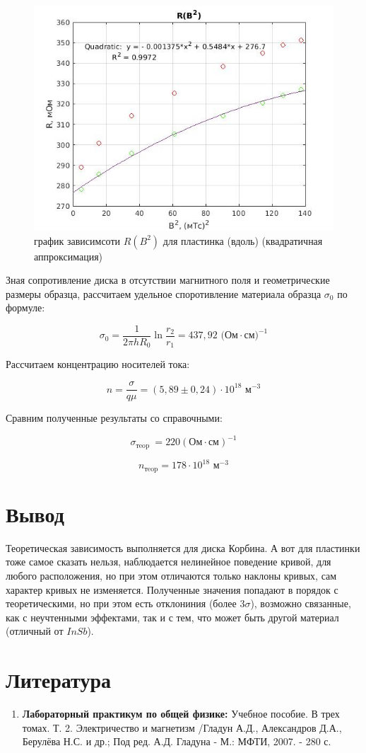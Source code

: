 \documentclass[a4paper, 12pt]{article}%
\begin{document}
\begin{center}
\begin{figure}[!h]
    \centering
    \includegraphics[width = 10 cm]{graph2(no_disk)(quadratic_2).jpg}
    \caption{график зависимсоти $R(B^2)$ для пластинка (вдоль) (квадратичная аппроксимация)}
    \label{ser3_q}
\end{figure}
\end{center}

Зная сопротивление диска в отсутствии магнитного поля и геометрические размеры образца, рассчитаем удельное споротивление материала образца $\sigma_0$ по формуле:

\[ \sigma_{0}=\frac{1}{2 \pi h R_{0}} \ln \frac{r_{2}}{r_{1}}= 437,92 \text{ (Ом} \cdot \text{см)}^{-1}\]

Рассчитаем концентрацию носителей тока:

\[ n=\frac{\sigma}{q \mu} = (5,89 \pm 0,24) \cdot 10^{18} \text{ м}^{-3} \]


Сравним полученные результаты со справочными:

\[ \sigma_{\text {тeop }}= 220 \left(\text{Ом} \cdot \text{см}\right)^{-1}\]

\[ n_{\text{тeop}}= 178 \cdot 10^{18} \text{ м}^{-3} \]

\section{Вывод}

Теоретическая зависимость выполняется для диска Корбина. А вот для пластинки тоже самое сказать нельзя, наблюдается нелинейное поведение кривой, для любого расположения, но при этом отличаются 
только наклоны кривых, сам характер кривых не изменяется. Полученные значения попадают в порядок с теоретическими, но при этом есть отклониния (более $3\sigma$), возможно связанные, как с неучтенными эффектами, так и с тем, что может быть другой материал (отличный от $InSb$).
\section{Литература}

\begin{enumerate}
\item \textbf{Лабораторный практикум по общей физике:} Учебное пособие. В трех томах. Т. 2. Электричество и магнетизм /Гладун А.Д., Александров Д.А., Берулёва Н.С. и др.; Под ред. А.Д. Гладуна - М.: МФТИ, 2007. - 280 с.

\end{enumerate}		
		
\end{document}
